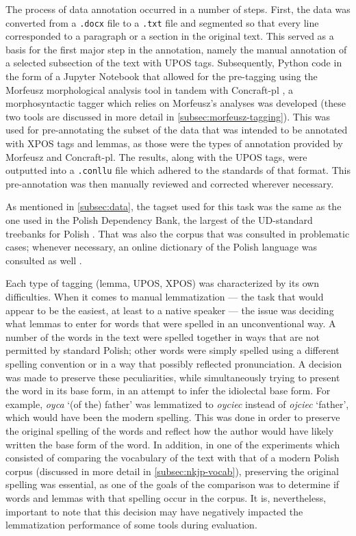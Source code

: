 The process of data annotation occurred in a number of steps. First, the data was converted from a \texttt{.docx} file to a \texttt{.txt} file and segmented so that every line corresponded to a paragraph or a section in the original text. This served as a basis for the first major step in the annotation, namely the manual annotation of a selected subsection of the text with UPOS tags. Subsequently, Python code in the form of a Jupyter Notebook that allowed for the pre-tagging using the Morfeusz morphological analysis tool \citep{kie:wol:17:morf} in tandem with Concraft-pl \citep{waszczuk-2012-harnessing, waszczuk2018morphosyntactic}, a morphosyntactic tagger which relies on Morfeusz's analyses was developed (these two tools are discussed in more detail in \autoref{subsec:morfeusz-tagging}). This was used for pre-annotating the subset of the data that was intended to be annotated with XPOS tags and lemmas, as those were the types of annotation provided by Morfeusz and Concraft-pl. The results, along with the UPOS tags, were outputted into a \texttt{.conllu} file which adhered to the standards of that format. This pre-annotation was then manually reviewed and corrected wherever necessary.

As mentioned in \autoref{subsec:data}, the tagset used for this task was the same as the one used in the Polish Dependency Bank, the largest of the UD-standard treebanks for Polish \citep{wroblewska-2018-extended}. That was also the corpus that was consulted in problematic cases; whenever necessary, an online dictionary of the Polish language was consulted as well \citep{pwn_n.d.}.

Each type of tagging (lemma, UPOS, XPOS) was characterized by its own difficulties. When it comes to manual lemmatization --- the task that would appear to be the easiest, at least to a native speaker --- the issue was deciding what lemmas to enter for words that were spelled in an unconventional way. A number of the words in the text were spelled together in ways that are not permitted by standard Polish; other words were simply spelled using a different spelling convention or in a way that possibly reflected pronunciation. A decision was made to preserve these peculiarities, while simultaneously trying to present the word in its base form, in an attempt to infer the idiolectal base form. For example, \textit{oyca} `(of the) father' was lemmatized to \textit{oyciec} instead of \textit{ojciec} `father', which would have been the modern spelling. This was done in order to preserve the original spelling of the words and reflect how the author would have likely written the base form of the word. In addition, in one of the experiments which consisted of comparing the vocabulary of the text with that of a modern Polish corpus (discussed in more detail in \autoref{subsec:nkjp-vocab}), preserving the original spelling was essential, as one of the goals of the comparison was to determine if words and lemmas with that spelling occur in the corpus. It is, nevertheless, important to note that this decision may have negatively impacted the lemmatization performance of some tools during evaluation. 

